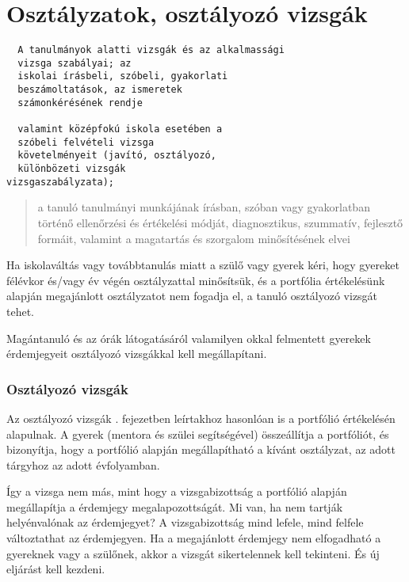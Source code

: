 

\section{Osztályzatok, osztályozó vizsgák}
\begin{verbatim}
  A tanulmányok alatti vizsgák és az alkalmassági 
  vizsga szabályai; az
  iskolai írásbeli, szóbeli, gyakorlati 
  beszámoltatások, az ismeretek
  számonkérésének rendje

  valamint középfokú iskola esetében a 
  szóbeli felvételi vizsga
  követelményeit (javító, osztályozó, 
  különbözeti vizsgák
vizsgaszabályzata);
\end{verbatim}

\begin{quote}
  a tanuló tanulmányi munkájának írásban, szóban vagy gyakorlatban történő
  ellenőrzési és értékelési módját, diagnosztikus, szummatív, fejlesztő
  formáit, valamint a magatartás és szorgalom minősítésének elvei
\end{quote}

Ha iskolaváltás vagy továbbtanulás miatt a szülő vagy gyerek kéri, hogy
gyereket félévkor és/vagy év végén osztályzattal minősítsük, és a
portfólia értékelésünk alapján megajánlott osztályzatot nem fogadja el,
a tanuló osztályozó vizsgát tehet.

Magántanuló és az órák látogatásáról valamilyen okkal felmentett
gyerekek érdemjegyeit osztályozó vizsgákkal kell
megállapítani.

\subsubsection{Osztályozó vizsgák}
\label{sec:osztalyozo_vizsga}
Az osztályozó vizsgák . fejezetben leírtakhoz
hasonlóan is a portfólió értékelésén alapulnak. A gyerek (mentora és szülei
segítségével) összeállítja a portfóliót, és bizonyítja, hogy a
portfólió alapján megállapítható a kívánt osztályzat, az adott tárgyhoz
az adott évfolyamban.

Így a vizsga nem más, mint hogy a vizsgabizottság a portfólió alapján
megállapítja a érdemjegy megalapozottságát. Mi van, ha nem tartják
helyénvalónak az érdemjegyet? A vizsgabizottság mind lefele, mind felfele
változtathat az érdemjegyen. Ha a megajánlott érdemjegy nem elfogadható a
gyereknek vagy a szülőnek, akkor a vizsgát sikertelennek kell tekinteni. És új
eljárást kell kezdeni.

